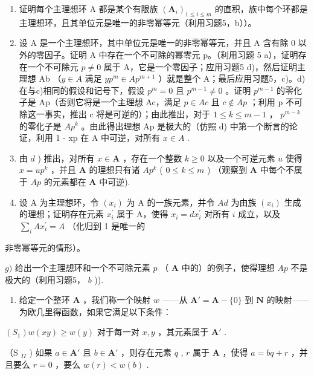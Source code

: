 \begin{enumerate}
\def\labelenumi{\alph{enumi})}
\setcounter{enumi}{1}
\item
  证明每个主理想环 A 都是某个有限族 \((\mathbf{A}_{i})_{1\leq i\leq m}\) 的直积，族中每个环都是主理想环，且其单位元是唯一的非零幂等元（利用习题5，b））。
\item
  设 A 是一个主理想环，其中单位元是唯一的非零幂等元，并且 A 含有除 0 以外的零因子。证明 A 中存在一个不可除的幂零元 p。（利用习题 5 a），证明存在一个不可除元 \(p \neq 0\) 属于 A，它是一个零因子；应用习题5 d)，然后证明主理想 Ab （\(y \in A\) 满足 \(yp^{m} \in Ap^{m+1}\) ）就是整个 A；最后应用习题5，c)。d) 在与c)相同的假设和记号下，假设 \(p^{m} = 0\) 且 \(p^{m-1} \neq 0\) 。证明 \(p^{m-1}\) 的零化子是 Ap（否则它将是一个主理想 Ac，满足 \(p \in Ac\) 且 \(c \notin Ap\) ；利用 p 不可除这一事实，推出 c 将是可逆的）；由此推出，对于 \(1 \leq k \leq m-1\) ， \(p^{m-k}\) 的零化子是 \(Ap^{k}\) 。由此得出理想 Ap 是极大的（仿照 d) 中第一个断言的论证，利用 1 - xp 在 A 中可逆，对所有 \(x \in A\) .
\item
  由 \(d\) ) 推出，对所有 \(x \in \mathbf{A}\) ，存在一个整数 \(k \geqslant 0\) 以及一个可逆元素 \(u\) 使得 \(x = up^k\) ，并且 \(\mathbf{A}\) 的理想只有诸 \(Ap^k\) ( \(0 \leqslant k \leqslant m\) ) （观察到 \(\mathbf{A}\) 中每个不属于 \(Ap\) 的元素都在 \(\mathbf{A}\) 中可逆).
\item
  设 A 为主理想环，令 \((x_{i})\) 为 A 的一族元素，并令 \(Ad\) 为由族 \((x_{i})\) 生成的理想；证明存在元素 \(x_{i}^{\prime}\) 属于 A，使得 \(x_{i} = dx_{i}^{\prime}\) 对所有 \(i\) 成立，以及 \(\sum_{i} Ax_{i}^{\prime} = A\) （化归到 1 是唯一的
\end{enumerate}

非零幂等元的情形）。

\(g)\) 给出一个主理想环和一个不可除元素 \(p\) （ \(\mathbf{A}\) 中的）的例子，使得理想 \(Ap\) 不是极大的（利用习题5， \(b\) )).

\begin{enumerate}
\def\labelenumi{\arabic{enumi})}
\setcounter{enumi}{6}
\tightlist
\item
  给定一个整环 \(\mathbf{A}\) ，我们称一个映射 \(w\) ——从 \(\mathbf{A}' = \mathbf{A} - \{0\}\) 到 \(\mathbf{N}\) 的映射——为欧几里得函数，如果它满足以下条件：
\end{enumerate}

\((S_{1}) w(xy) \geqslant w(y)\) 对于每一对 \(x, y\) ，其元素属于 \(\mathbf{A}'\) .

（S \(_{II}\) ) 如果 \(a \in \mathbf{A}'\) 且 \(b \in \mathbf{A}'\) ，则存在元素 \(q\) , \(r\) 属于 \(\mathbf{A}\) ，使得 \(a = bq + r\) ，并且要么 \(r = 0\) ，要么 \(w(r) < w(b)\) .

